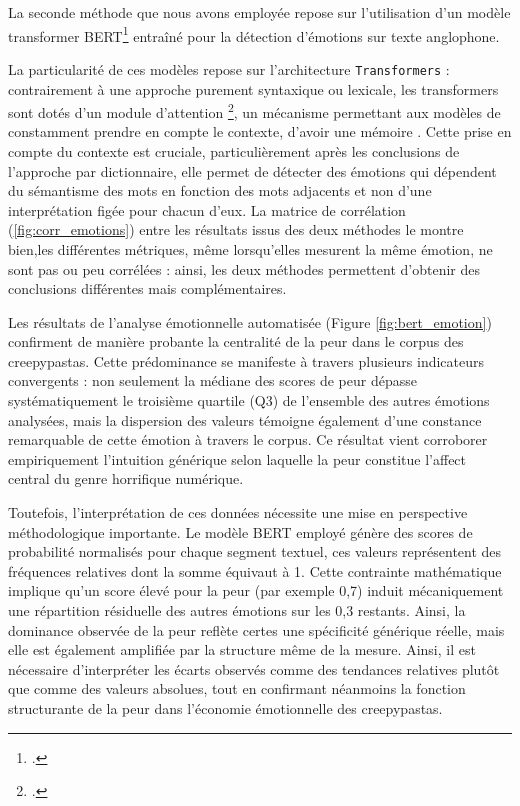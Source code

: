 \documentclass[12pt,a4paper,oneside,titlepage]{book} %
\begin{document}
La seconde méthode que nous avons employée repose sur l'utilisation d'un modèle transformer BERT\footcite{hartmann2022emotionenglish} entraîné pour la détection d'émotions sur texte anglophone.

La particularité de ces modèles repose sur l'architecture \texttt{Transformers} : contrairement à une approche purement syntaxique ou lexicale, les transformers sont dotés d'un module d'attention \footcite{attention2017}, un mécanisme permettant aux modèles de constamment prendre en compte le contexte, d'avoir une \og mémoire \fg{}. Cette prise en compte du contexte est cruciale, particulièrement après les conclusions de l'approche par dictionnaire, elle permet de détecter des émotions qui dépendent du sémantisme des mots en fonction des mots adjacents et non d'une interprétation figée pour chacun d'eux. La matrice de corrélation (\ref{fig:corr_emotions}) entre les résultats issus des deux méthodes le montre bien,les différentes métriques, même lorsqu'elles mesurent la même émotion, ne sont pas ou peu corrélées : ainsi, les deux méthodes permettent d'obtenir des conclusions différentes mais complémentaires.


Les résultats de l'analyse émotionnelle automatisée (Figure \ref{fig:bert_emotion}) confirment de manière probante la centralité de la peur dans le corpus des creepypastas. Cette prédominance se manifeste à travers plusieurs indicateurs convergents : non seulement la médiane des scores de peur dépasse systématiquement le troisième quartile (Q3) de l'ensemble des autres émotions analysées, mais la dispersion des valeurs témoigne également d'une constance remarquable de cette émotion à travers le corpus. Ce résultat vient corroborer empiriquement l'intuition générique selon laquelle la peur constitue l'affect central du genre horrifique numérique.

Toutefois, l'interprétation de ces données nécessite une mise en perspective méthodologique importante. Le modèle BERT employé génère des scores de probabilité normalisés pour chaque segment textuel, ces valeurs représentent des fréquences relatives dont la somme équivaut à 1. Cette contrainte mathématique implique qu'un score élevé pour la peur (par exemple 0,7) induit mécaniquement une répartition résiduelle des autres émotions sur les 0,3 restants. Ainsi, la dominance observée de la peur reflète certes une spécificité générique réelle, mais elle est également amplifiée par la structure même de la mesure. Ainsi, il est nécessaire d'interpréter les écarts observés comme des tendances relatives plutôt que comme des valeurs absolues, tout en confirmant néanmoins la fonction structurante de la peur dans l'économie émotionnelle des creepypastas.
\end{document}
